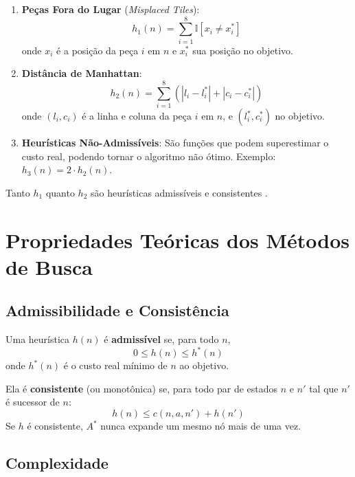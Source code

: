 \begin{enumerate}[label=(\alph*)]  
    \item \textbf{Peças Fora do Lugar} (\emph{Misplaced Tiles}):  
    \begin{equation}  
        h_1(n) = \sum_{i=1}^{8} \mathbb{I}[x_i \neq x_i^*]  
    \end{equation}  
    onde $x_i$ é a posição da peça $i$ em $n$ e $x_i^*$ sua posição no objetivo.  
  
    \item \textbf{Distância de Manhattan}:  
    \begin{equation}  
        h_2(n) = \sum_{i=1}^{8} \left( |l_i - l_i^*| + |c_i - c_i^*| \right)  
    \end{equation}  
    onde $(l_i, c_i)$ é a linha e coluna da peça $i$ em $n$, e $(l_i^*, c_i^*)$ no objetivo.  
  
    \item \textbf{Heurísticas Não-Admissíveis}: São funções que podem superestimar o custo real, podendo tornar o algoritmo não ótimo. Exemplo: $h_3(n) = 2 \cdot h_2(n)$.  
\end{enumerate}  
  
Tanto $h_1$ quanto $h_2$ são heurísticas admissíveis e consistentes \cite{russell2010artificial}.  
  
\section{Propriedades Teóricas dos Métodos de Busca}  
  
\subsection{Admissibilidade e Consistência}  
  
Uma heurística $h(n)$ é \textbf{admissível} se, para todo $n$,  
\begin{equation}  
    0 \leq h(n) \leq h^*(n)  
\end{equation}  
onde $h^*(n)$ é o custo real mínimo de $n$ ao objetivo.  
  
Ela é \textbf{consistente} (ou monotônica) se, para todo par de estados $n$ e $n'$ tal que $n'$ é sucessor de $n$:  
\begin{equation}  
    h(n) \leq c(n, a, n') + h(n')  
\end{equation}  
Se $h$ é consistente, $A^*$ nunca expande um mesmo nó mais de uma vez.  
  
\subsection{Complexidade}  
  

